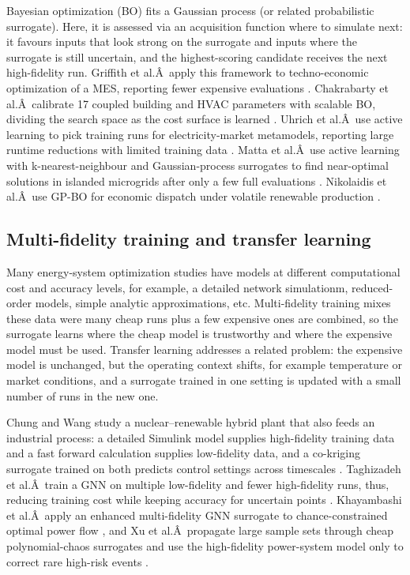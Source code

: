Bayesian optimization (BO) fits a Gaussian process (or related
probabilistic surrogate). Here, it is assessed via an acquisition
function where to simulate next: it favours inputs that look strong on
the surrogate and inputs where the surrogate is still uncertain, and the
highest-scoring candidate receives the next high-fidelity run. Griffith
et al.Â~apply this framework to techno-economic optimization of a MES,
reporting fewer expensive evaluations \cite{Griffith2025}. Chakrabarty et
al.Â~calibrate 17 coupled building and HVAC parameters with scalable BO,
dividing the search space as the cost surface is learned
\cite{Chakrabarty2021}. Uhrich et al.Â~use active learning to pick training
runs for electricity-market metamodels, reporting large runtime
reductions with limited training data \cite{Uhrich2026211}. Matta et al.Â~use
active learning with k-nearest-neighbour and Gaussian-process surrogates
to find near-optimal solutions in islanded microgrids after only a few
full evaluations \cite{Matta2026}. Nikolaidis et al.Â~use GP-BO for economic
dispatch under volatile renewable production \cite{Nikolaidis2021}.

\subsection{Multi-fidelity training and transfer learning}
\label{sec:doe:multifidelity}

Many energy-system optimization studies have models at different
computational cost and accuracy levels, for example, a detailed network
simulationm, reduced-order models, simple analytic approximations, etc.
Multi-fidelity training mixes these data were many cheap runs plus a few
expensive ones are combined, so the surrogate learns where the cheap
model is trustworthy and where the expensive model must be used.
Transfer learning addresses a related problem: the expensive model is
unchanged, but the operating context shifts, for example temperature or
market conditions, and a surrogate trained in one setting is updated
with a small number of runs in the new one.

Chung and Wang study a nuclear--renewable hybrid plant that also feeds
an industrial process: a detailed Simulink model supplies high-fidelity
training data and a fast forward calculation supplies low-fidelity data,
and a co-kriging surrogate trained on both predicts control settings
across timescales \cite{Chung2023}. Taghizadeh et al.Â~train a GNN on
multiple low-fidelity and fewer high-fidelity runs, thus, reducing
training cost while keeping accuracy for uncertain points
\cite{Taghizadeh2024}. Khayambashi et al.Â~apply an enhanced multi-fidelity
GNN surrogate to chance-constrained optimal power flow
\cite{Khayambashi202453}, and Xu et al.Â~propagate large sample sets through
cheap polynomial-chaos surrogates and use the high-fidelity power-system
model only to correct rare high-risk events \cite{Xu20203127}.

